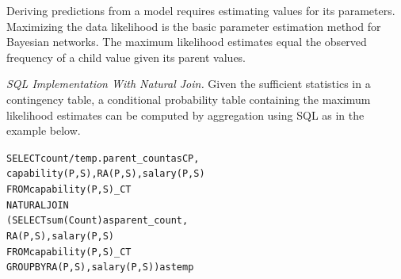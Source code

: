 Deriving predictions from a model requires estimating values for its parameters.  Maximizing the data likelihood is the basic parameter estimation method for Bayesian networks. The maximum likelihood estimates equal the observed frequency of a child value given its parent values.

{\em SQL Implementation With Natural Join.} Given the sufficient statistics in a contingency table, a conditional probability table containing the maximum likelihood estimates can be computed by aggregation using SQL as in the example below. 

\begin{alltt}
SELECT count/temp.parent\_count as CP, 
capability(P,S), RA(P,S), salary(P,S) 
FROM capability(P,S)\_CT 
NATURAL JOIN  
(SELECT sum(Count) as parent\_count, 
RA(P,S), salary(P,S) 
FROM capability(P,S)\_CT  
GROUP BY  RA(P,S), salary(P,S) ) as temp
\end{alltt}


%
%


